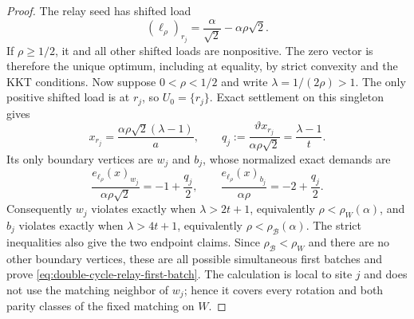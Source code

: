 \begin{proof}
The relay seed has shifted load
\begin{equation*}
 (\ell_\rho)_{r_j}=\frac{\alpha}{\sqrt2}-\alpha\rho\sqrt2.
\end{equation*}
If $\rho\geq1/2$, it and all other shifted loads are nonpositive.  The zero
vector is therefore the unique optimum, including at equality, by strict
convexity and the KKT conditions.  Now suppose $0<\rho<1/2$ and write
$\lambda=1/(2\rho)>1$.  The only positive shifted load is at $r_j$, so
$U_0=\{r_j\}$.  Exact settlement on this singleton gives
\begin{equation}
 x_{r_j}=\frac{\alpha\rho\sqrt2(\lambda-1)}{a},
 \qquad
 q_j:=\frac{\vartheta x_{r_j}}{\alpha\rho\sqrt2}
      =\frac{\lambda-1}{t}.
 \label{eq:double-cycle-relay-seed-coordinate}
\end{equation}
Its only boundary vertices are $w_j$ and $b_j$, whose normalized exact
demands are
\begin{equation}
 \frac{e_{\ell_\rho}(x)_{w_j}}{\alpha\rho\sqrt2}
 =-1+\frac{q_j}{2},
 \qquad
 \frac{e_{\ell_\rho}(x)_{b_j}}{\alpha\rho}
 =-2+\frac{q_j}{2}.
 \label{eq:double-cycle-relay-seed-demands}
\end{equation}
Consequently $w_j$ violates exactly when
$\lambda>2t+1$, equivalently $\rho<\rho_W(\alpha)$, and $b_j$ violates
exactly when $\lambda>4t+1$, equivalently
$\rho<\rho_{\mathcal B}(\alpha)$.  The strict inequalities also give the
two endpoint claims.  Since $\rho_{\mathcal B}<\rho_W$ and there are no
other boundary vertices, these are all possible simultaneous first batches
and prove \cref{eq:double-cycle-relay-first-batch}.  The calculation is
local to site $j$ and does not use the matching neighbor of $w_j$; hence it
covers every rotation and both parity classes of the fixed matching on $W$.
\end{proof}

